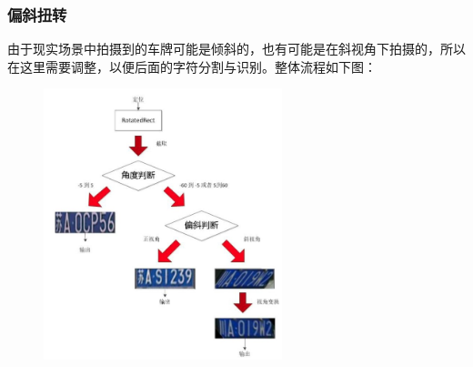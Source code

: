 \subsubsection{偏斜扭转}
由于现实场景中拍摄到的车牌可能是倾斜的，也有可能是在斜视角下拍摄的，所以在这里需要调整，以便后面的字符分割与识别。整体流程如下图：
\begin{figure}[H]
    \centering 
    \includegraphics[width=0.618\textwidth]{image/2_6_4_1.jpg}    
    \label{logic}
\end{figure}
